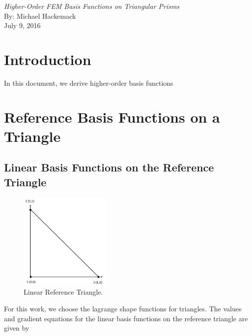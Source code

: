 \documentclass[11pt]{article}
\begin{document}
\begin{center}
{\em \huge Higher-Order FEM Basis Functions on Triangular Prisms}\\[8mm]
{\LARGE By: Michael Hackemack}\\[3mm]
{\large July 9, 2016} \\[15mm]
\end{center}



\section{Introduction}
\label{sec::Introduction}

In this document, we derive higher-order basis functions

\section{Reference Basis Functions on a Triangle}
\label{sec::triref}

\subsection{Linear Basis Functions on the Reference Triangle}
\label{sec::triref_linear}

\begin{figure}[hbt]
\centering
\includegraphics[width=0.4\textwidth]{./Figures/ref_triangle_linear.png}
\caption{Linear Reference Triangle.}
\hspace{0.5cm}
\label{fig::ref_triangle_lin}
\end{figure}

For this work, we choose the lagrange shape functions for triangles. The values and gradient equations for the linear basis functions on the reference triangle are given by
\end{document}
